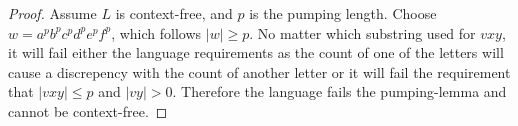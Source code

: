 \documentclass{article}
\begin{document}
\begin{enumerate}
            \begin{proof}
                Assume $L$ is context-free, and $p$ is the pumping length. Choose $w = a^pb^pc^pd^pe^pf^p$, which follows $|w| \geq p$. No matter which substring used for $vxy$, it will fail either the language requirements as the count of one of the letters will cause a discrepency with the count of another letter or it will fail the requirement that $|vxy| \leq p$ and $|vy|>0$. Therefore the language fails the pumping-lemma and cannot be context-free.
            \end{proof}
    \end{enumerate}
\end{document}
